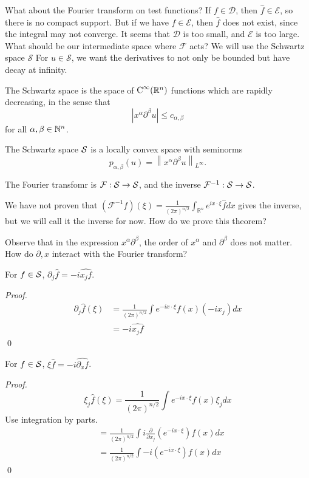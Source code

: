 What about the Fourier transform on test functions? If $f \in \mathcal{D}$, then $\widehat{f} \in \mathcal{E}$, so there is no compact support. But if we have $f \in \mathcal{E}$, then $\widehat{f}$ does not exist, since the integral may not converge. It seems that $\mathcal{D}$ is too small, and $\mathcal{E}$ is too large. What should be our intermediate space where $\mathcal{F}$ acts? We will use the Schwartz space $\mathcal{S}$ For $u \in \mathcal{S}$, we want the derivatives to not only be bounded but have decay at infinity.

\begin{definition}
 The Schwartz space is the space of $\operatorname{C}^\infty (\mathbb{R}^n)$ functions which are rapidly decreasing, in the sense that 
\[
    \left|x^{\alpha} \partial^{\beta} u\right| \leq c_{\alpha, \beta}
\]
for all $\alpha, \beta\in \mathbb{N}^n$.

The Schwartz space $\mathcal{S}$ is a locally convex space with seminorms
\[
    p_{\alpha, \beta}(u)=\left\|x^{\alpha} \partial^{\beta} u\right\|_{L^{\infty}}.
\]
\end{definition}

\begin{theorem}
The Fourier transfomr is $\mathcal{F}: \mathcal{S} \to \mathcal{S}$, and the inverse $\mathcal{F}^{-1}:\mathcal{S} \to \mathcal{S}$.
\end{theorem}
We have not proven that $\left(\mathcal{F}^{-1} f\right)(\xi)=\frac{1}{(2 \pi)^{n / 2}} \int_{\mathbb{R}^{n}} e^{i x \cdot \xi} \widehat{f} d x$ gives the inverse, but we will call it the inverse for now. How do we prove this theorem?

Observe that in the expression $x^{\alpha} \partial^{\beta}$, the order of $x^{\alpha}$ and $\partial^{\beta}$ does not matter. How do $\partial, x$ interact with the Fourier transform?

\begin{proposition}
For $f\in \mathcal{S}$, $\partial_j \hat f = -i \widehat{x_jf}.$
\end{proposition}
\begin{proof}
    \[
        \begin{aligned}
            \partial_{j} \widehat{f}(\xi) &=\frac{1}{(2 \pi)^{n / 2}} \int e^{-i x \cdot \xi} f(x)\left(-i x_{j}\right) d x \\
            &=-i \widehat{x_{j} f}
            \end{aligned}
    \]
    \qed 
\end{proof}

\begin{proposition}
For $f\in \mathcal{S}$, $\xi \hat f = -i \widehat{\partial_x f}$.
\end{proposition}
\begin{proof}
    $$
    \xi_{j} \widehat{f}(\xi)=\frac{1}{(2 \pi)^{n / 2}} \int e^{-i x \cdot \xi} f(x) \xi_{j} d x
    $$
    Use integration by parts.
    $$
    \begin{aligned}
    &=\frac{1}{(2 \pi)^{n / 2}} \int i \frac{\partial}{\partial x_{j}}\left(e^{-i x \cdot \xi}\right) f(x) d x \\
    &=\frac{1}{(2 \pi)^{n / 2}} \int-i\left(e^{-i x \cdot \xi}\right) f(x) d x
    \end{aligned}
    $$
    \qed   
\end{proof}

